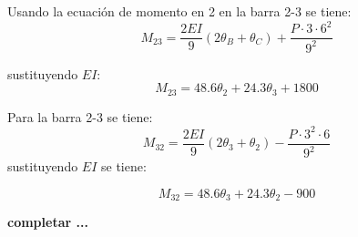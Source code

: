 Usando la ecuación de momento en 2 en la barra 2-3 se tiene:
$$
	M_{23} = \frac{2EI}{9} (2\theta_B +\theta_C ) + \frac{ P \cdot 3 \cdot 6^2}{9^2}
$$

sustituyendo $EI$:
%
\begin{equation}
\boxed{
M_{23} = 48.6 \theta_2 + 24.3 \theta_3  + 1800
}
\end{equation}



Para la barra 2-3 se tiene:
$$
M_{32} = \frac{2EI}{9} (2\theta_3 +\theta_2 ) - \frac{P \cdot 3^2 \cdot 6}{9^2}
$$
sustituyendo $EI$ se tiene:

\begin{equation}
\boxed{
M_{32} = 48.6 \theta_3 + 24.3 \theta_2 - 900
}
\end{equation}

\textbf{completar
...
}
%
%
%
%
%
%
%
%
%
%
%
%
%
%

